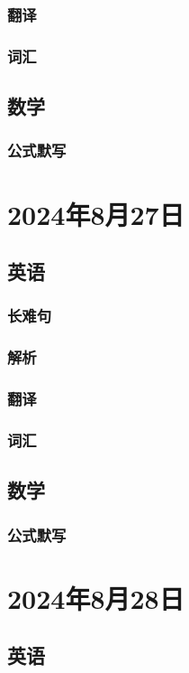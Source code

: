 \documentclass[UTF8]{ctexart}
\begin{document}
\subsubsection{翻译}
\subsubsection{词汇}
\subsection{数学}
\subsubsection{公式默写}
\begin{multicols}{2}
\end{multicols}
\section{2024年8月27日}
\subsection{英语}
\subsubsection{长难句}
\subsubsection{解析}
\subsubsection{翻译}
\subsubsection{词汇}
\subsection{数学}
\subsubsection{公式默写}
\begin{multicols}{2}
\end{multicols}
\section{2024年8月28日}
\subsection{英语}
\end{document}
